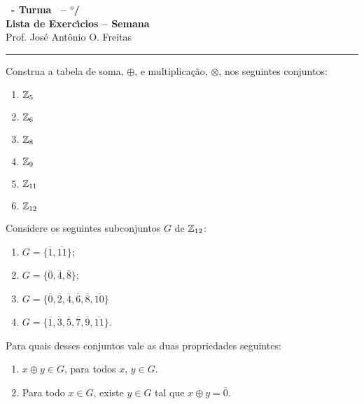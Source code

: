 \documentclass[12pt]{exam}
\begin{document}
    \begin{center}
    {\Large\bf \disciplina\ - Turma \turma\ -- \semestre$^{o}$/\ano} \\ \vspace{9pt} {\large\bf
        Lista de Exerc{\'\i}cios -- Semana \numerosemana}\\ \vspace{9pt} Prof. Jos{\'e} Ant{\^o}nio O. Freitas
    \end{center}
    \hrule

    \vspace{.6cm}

    \questao{} Construa a tabela de soma, $\oplus$, e multiplicação, $\otimes$, nos seguintes conjuntos:
\begin{multicols}{3}
    \begin{enumerate}[label=({\alph*})]
        \item $\mathbb{Z}_5$
        \item $\mathbb{Z}_6$
        \item $\mathbb{Z}_8$
        \item $\mathbb{Z}_9$
        \item $\mathbb{Z}_{11}$
        \item $\mathbb{Z}_{12}$
    \end{enumerate}
\end{multicols}

\vspace{.3cm}

\questao{} Considere os seguintes subconjuntos $G$ de $\mathbb{Z}_{12}$:
\begin{multicols}{2}
    \begin{enumerate}[label=({\alph*})]
        \item $G=\{\overline{1},\overline{11}\}$;

        \item $G=\{\overline{0},\overline{4},\overline{8}\}$;

        \item $G=\{\overline{0},\overline{2},\overline{4},\overline{6},\overline{8},\overline{10}\}$
        \item $G=\{\overline{1}, \overline{3},\overline{5},\overline{7},\overline{9},\overline{11}\}$.
    \end{enumerate}
\end{multicols}

Para quais desses conjuntos vale as duas propriedades seguintes:
\begin{enumerate}[label=({\roman*})]
    \item $x \oplus y \in G$, para todos $x$, $y \in G$.
    \item Para todo $x \in G$, existe $y \in G$ tal que $x \oplus y = \overline{0}$.
\end{enumerate}
\end{document}
